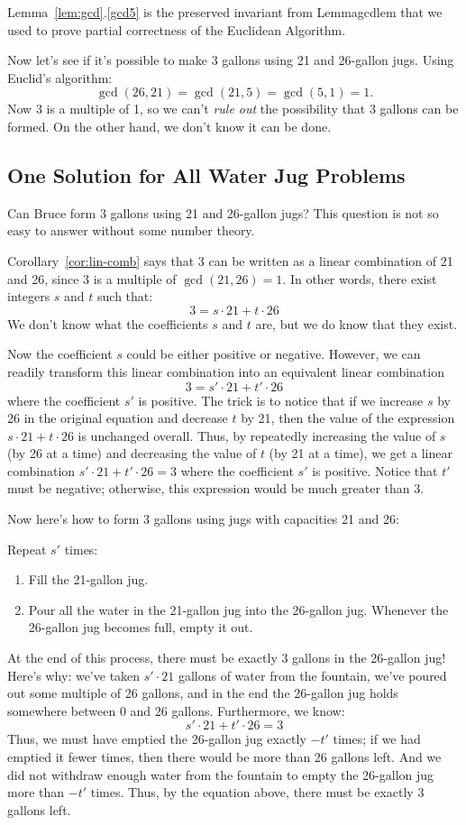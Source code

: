 Lemma~\ref{lem:gcd}.\ref{gcd5} is the preserved invariant from
Lemma{gcdlem} that we used to prove partial correctness of the Euclidean
Algorithm.

Now let's see if it's possible to make 3 gallons using 21 and 26-gallon
jugs.  Using Euclid's algorithm:
%
\[
\gcd(26, 21) = \gcd(21, 5) = \gcd(5, 1) = 1.
\]
%
Now 3 is a multiple of 1, so we can't \emph{rule out} the possibility
that 3 gallons can be formed.  On the other hand, we don't know it can be
done.

\subsection{One Solution for All Water Jug Problems}

Can Bruce form 3 gallons using 21 and 26-gallon jugs?  This question
is not so easy to answer without some number theory.

Corollary~\ref{cor:lin-comb} says that 3 can be written as a linear
combination of 21 and 26, since 3 is a multiple of $\gcd(21, 26) = 1$.
In other words, there exist integers $s$ and $t$ such that:
%
\[
3 = s \cdot 21 + t \cdot 26
\]
%
We don't know what the coefficients $s$ and $t$ are, but we do know
that they exist.

Now the coefficient $s$ could be either positive or negative.
However, we can readily transform this linear combination into an
equivalent linear combination
%
\[
3 = s' \cdot 21 + t' \cdot 26
\]
%
where the coefficient $s'$ is positive.  The trick is to notice that
if we increase $s$ by 26 in the original equation and decrease $t$ by
21, then the value of the expression $s \cdot 21 + t \cdot 26$ is
unchanged overall.  Thus, by repeatedly increasing the value of $s$
(by 26 at a time) and decreasing the value of $t$ (by 21 at a time),
we get a linear combination $s' \cdot 21 + t' \cdot 26 = 3$ where the
coefficient $s'$ is positive.  Notice that $t'$ must be negative;
otherwise, this expression would be much greater than 3.

Now here's how to form 3 gallons using jugs with capacities 21 and 26:

Repeat $s'$ times:
\begin{enumerate}
\item Fill the 21-gallon jug.
\item Pour all the water in the 21-gallon jug into the 26-gallon jug.
Whenever the 26-gallon jug becomes full, empty it out.
\end{enumerate}
%
At the end of this process, there must be exactly 3 gallons in the
26-gallon jug!  Here's why: we've taken $s' \cdot 21$ gallons of water
from the fountain, we've poured out some multiple of 26 gallons, and
in the end the 26-gallon jug holds somewhere between 0 and 26 gallons.
Furthermore, we know:
%
\[
s' \cdot 21 + t' \cdot 26 = 3
\]
%
Thus, we must have emptied the 26-gallon jug exactly $-t'$ times; if
we had emptied it fewer times, then there would be more than 26
gallons left.  And we did not withdraw enough water from the fountain
to empty the 26-gallon jug more than $-t'$ times.  Thus, by the
equation above, there must be exactly 3 gallons left.

